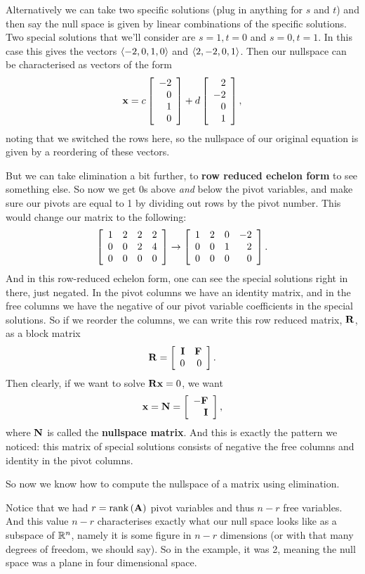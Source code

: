 Alternatively we can take two specific solutions (plug in anything for $s$ and $t$) and then say the null space is given by linear combinations of the specific solutions. Two special solutions that we'll consider are $s=1,t=0$ and $s=0,t=1$. In this case this gives the vectors $\langle -2,0,1,0 \rangle $ and $\langle 2,-2,0, 1 \rangle$. Then our nullspace can be characterised as vectors of the form
\[ \boldsymbol{\mathbf{x}} = c\left[ \begin{array}{rrrrrrrrrrrrrrrrrrrrrrrrr} -2\\0\\1\\0\\ \end{array} \right] + d\left[ \begin{array}{rrrrrrrrrrrrrrrrrrrrrrrrr} 2\\-2\\0\\1\\ \end{array} \right], \]
noting that we switched the rows here, so the nullspace of our original equation is given by a reordering of these vectors.

But we can take elimination a bit further, to \textbf{row reduced echelon form} to see something else. So now we get 0s above \textit{and} below the pivot variables, and make sure our pivots are equal to 1 by dividing out rows by the pivot number. This would change our matrix to the following:
\[ \left[ \begin{array}{rrrrrrrrrrrrrrrrrrrrrrrrr} 1&2&2&2\\0&0&2&4\\0&0&0&0\\ \end{array} \right] \rightarrow \left[ \begin{array}{rrrrrrrrrrrrrrrrrrrrrrrrr} 1&2&0&-2\\0&0&1&2\\0&0&0&0\\ \end{array} \right]. \]
And in this row-reduced echelon form, one can see the special solutions right in there, just negated. In the pivot columns we have an identity matrix, and in the free columns we have the negative of our pivot variable coefficients in the special solutions. So if we reorder the columns, we can write this row reduced matrix, $\boldsymbol{\mathbf{R}}$, as a block matrix
\[ \boldsymbol{\mathbf{R}} = \left[ \begin{array}{rrrrrrrrrrrrrrrrrrrrrrrrr} \boldsymbol{\mathbf{I}} & \boldsymbol{\mathbf{F}} \\ 0&0\\ \end{array} \right]. \]
Then clearly, if we want to solve $\boldsymbol{\mathbf{R}}\boldsymbol{\mathbf{x}} = 0$, we want 
\[ \boldsymbol{\mathbf{x}} = \boldsymbol{\mathbf{N}} = \left[ \begin{array}{rrrrrrrrrrrrrrrrrrrrrrrrr} -\boldsymbol{\mathbf{F}}\\ \boldsymbol{\mathbf{I}}\\ \end{array} \right], \]
where $\boldsymbol{\mathbf{N}}$ is called the \textbf{nullspace matrix}. And this is exactly the pattern we noticed: this matrix of special solutions consists of negative the free columns and identity in the pivot columns. 
\eex

So now we know how to compute the nullspace of a matrix using elimination.

\brm
Notice that we had $r = \mathrm{rank}\,(\boldsymbol{\mathbf{A}})$ pivot variables and thus $n - r$ free variables. And this value $n-r$ characterises exactly what our null space looks like as a subspace of $\mathbb{R}^n$, namely it is some figure in $n-r$ dimensions (or with that many degrees of freedom, we should say). So in the example, it was 2, meaning the null space was a plane in four dimensional space.
\erm